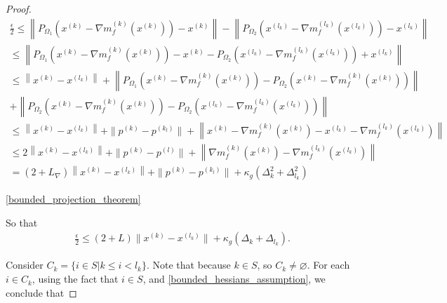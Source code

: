 \documentclass{article}
\theoremstyle{case}
\newcommand{\lipgrad}{{L_{\nabla}}}
\newcommand{\xk}{{x^{(k)}}}
\newcommand{\dk}{\Delta_k}
\newcommand{\gk}{{\nabla m_f^{(k)}(x^{(k)})}}
\newcommand{\gradf}{\nabla f}
\begin{document}
\begin{proof}
\begin{align*}
\frac{\epsilon}{2} \le \left \|P_{\Omega_1}\left(\xk - \gk\right) - \xk\right \| - \left\|P_{\Omega_2}\left(x^{(l_k)} - {\nabla m_f^{(l_k)}\left(x^{(l_k)}\right)}\right) - x^{(l_k)}\right\| \\
\le \left\|P_{\Omega_1}\left(\xk - \gk\right) - \xk - P_{\Omega_2}\left(x^{(l_k)} - {\nabla m_f^{(l_k)}\left(x^{(l_k)}\right)}\right) + x^{(l_k)}\right\| \\
\le\left\|\xk - x^{(l_k)}\right\| +  \left\|P_{\Omega_1}\left(\xk - \gk\right) - P_{\Omega_2}\left(\xk - \gk\right)\right\| \\+ \left\|P_{\Omega_2}\left(\xk - \gk\right) - P_{\Omega_2}\left(x^{(l_k)} - {\nabla m_f^{(l_k)}\left(x^{(l_k)}\right)}\right)\right\| \\
\le\left\|\xk - x^{(l_k)}\right\| + \| p^{(k)} - p^{(k_l)}\| + \left\|\xk - \gk - x^{(l_k)} - {\nabla m_f^{(l_k)}\left(x^{(l_k)}\right)}\right\| \\
\le 2\left\|\xk - x^{(l_k)}\right\| + \| p^{(k)} - p^{(l)}\| + \left\|\gk - {\nabla m_f^{(l_k)}\left(x^{(l_k)}\right)}\right\|\\
=   (2 + \lipgrad) \left\|\xk - x^{(l_k)}\right\| + \| p^{(k)} - p^{(k_l)}\| + \kappa_g \left(\dk^2 + \Delta_{l_k}^2\right)
\end{align*}



\cref{bounded_projection_theorem}



So that
\begin{align}
\frac{\epsilon} 2 \le (2 + L) \|\xk - x^{(l_k)}\| + \kappa_{g}(\dk + \Delta_{l_k}).
\end{align}

Consider $C_k = \{i \in S | k \le i < l_k\}$.
Note that because $k \in S$, so $C_k \ne \varnothing $.
For each $i \in C_k$, using the fact that $i \in S$, and \cref{bounded_hessians_assumption}, we conclude that 


\end{proof}
\end{document}
